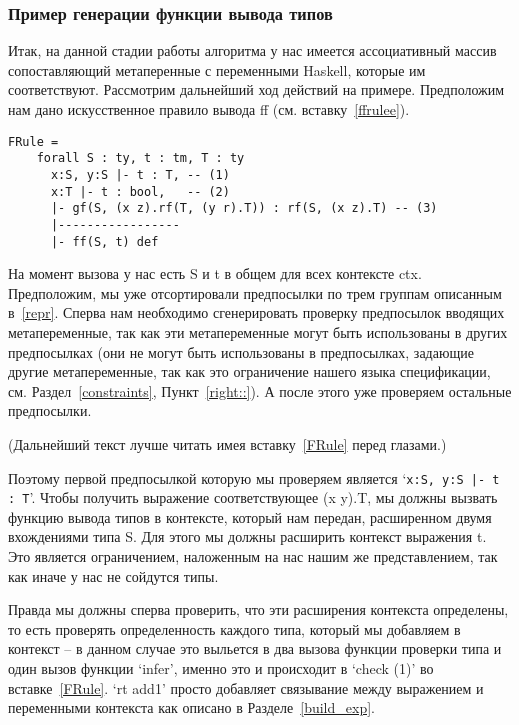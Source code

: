 \subsubsection{Пример генерации функции вывода типов}
Итак, на данной стадии работы алгоритма у нас имеется ассоциативный массив сопоставляющий метаперенные с переменными Haskell, которые им соответствуют. Рассмотрим дальнейший ход действий на примере. Предположим нам дано искусственное правило вывода ff (см. вставку~\ref{ffrulee}).

\begin{lstlisting}[label={ffrulee}, caption={Искусственное правило вывода для конструкции ff},captionpos=b, frame=single, float, floatplacement=H]
FRule =
    forall S : ty, t : tm, T : ty
      x:S, y:S |- t : T, -- (1)
      x:T |- t : bool,   -- (2)
      |- gf(S, (x z).rf(T, (y r).T)) : rf(S, (x z).T) -- (3)
      |-----------------
      |- ff(S, t) def
\end{lstlisting}

На момент вызова у нас есть S и t в общем для всех контексте ctx. Предположим, мы уже отсортировали предпосылки по трем группам описанным в~\ref{repr}. Сперва нам необходимо сгенерировать проверку предпосылок вводящих метапеременные, так как эти метапеременные могут быть использованы в других предпосылках (они не могут быть использованы в предпосылках, задающие другие метапеременные, так как это ограничение нашего языка спецификации, см. Раздел~\ref{constraints}, Пункт~\ref{right::}). А после этого уже проверяем остальные предпосылки.

(Дальнейший текст лучше читать имея вставку~\ref{FRule} перед глазами.)

Поэтому первой предпосылкой которую мы проверяем является `\lstinline{x:S, y:S |- t : T}'. Чтобы получить выражение соответствующее (x y).T, мы должны вызвать функцию вывода типов в контексте, который нам передан, расширенном двумя вхождениями типа S. Для этого мы должны расширить контекст выражения t. Это является ограничением, наложенным на нас нашим же представлением, так как иначе у нас не сойдутся типы.

Правда мы должны сперва проверить, что эти расширения контекста определены, то есть проверять определенность каждого типа, который мы добавляем в контекст -- в данном случае это выльется в два вызова функции проверки типа и один вызов функции `infer', именно это и происходит в `check (1)' во вставке~\ref{FRule}. `rt add1' просто добавляет связывание между выражением и переменными контекста как описано в Разделе~\ref{build_exp}.

